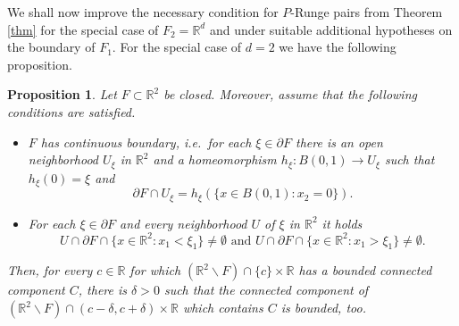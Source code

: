 \documentclass[10pt,leqno]{amsart}
\newtheorem{prop}{Proposition}%
\theoremstyle{definition}
\newcommand{\R}{\mathbb R}
\begin{document}
We shall now improve the necessary condition for $P$-Runge pairs from Theorem \ref{thm} for the special case of $F_2=\R^d$ and under suitable additional hypotheses on the boundary of $F_1$. For the special case of $d=2$ we have the following proposition.

\begin{prop}\label{prop:continuous boundary for d=2}
	Let $F\subset \R^2$ be closed. Moreover, assume that the following conditions are satisfied.
	\begin{itemize}
		\item[(a)] $F$ has continuous boundary, i.e.\ for each $\xi\in\partial F$ there is an open neighborhood $U_{\xi}$ in $\R^2$ and a homeomorphism $h_{\xi}\colon B(0,1)\to U_{\xi}$ such that $h_{\xi}(0)=\xi$ and
		$$\partial F\cap U_{\xi}=h_{\xi}\left(\{x\in B(0,1)\colon x_2=0\}\right).$$ 
		\item[(b)] For each $\xi\in\partial F$ and every neighborhood $U$ of $\xi$ in $\R^2$ it holds
		$$U\cap\partial F\cap\{x\in\R^2\colon x_1<\xi_1\}\neq\emptyset \text{ and }U\cap\partial F\cap\{x\in\R^2\colon x_1>\xi_1\}\neq\emptyset.$$	
	\end{itemize}
	Then, for every $c\in \R$ for which $(\R^2\backslash F)\cap \{c\}\times\R$ has a bounded connected component $C$, there is $\delta>0$ such that the connected component of $\left(\R^2\backslash F\right)\cap (c-\delta,c+\delta)\times\R$ which contains $C$ is bounded, too. 
\end{prop}
\end{document}
